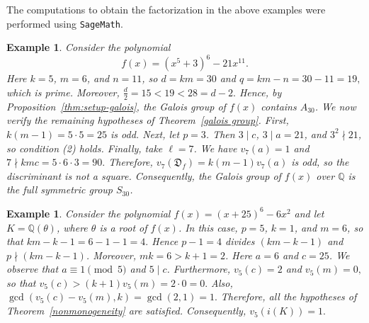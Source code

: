 \documentclass[table]{amsart}
\newtheorem{example}[theorem]{Example}
\newcommand{\D}{\mathfrak{D}}
\numberwithin{equation}{section}
\begin{document}
The computations to obtain the factorization  in the above examples were performed using \texttt{SageMath}.
\begin{example}
Consider the polynomial
\[
f(x)=(x^{5}+3)^{6}-21x^{11}.
\]
Here $k=5$, $m=6$, and $n=11$, so $d=km=30$ and $q=km-n=30-11=19,$ which is prime. Moreover, $\frac{d}{2}=15 < 19 < 28=d-2.$ Hence, by Proposition~\ref{thm:setup-galois}, the Galois group of $f(x)$ contains $A_{30}$. We now verify the remaining hypotheses of Theorem~\ref{galois group}. First, $k(m-1)=5\cdot5=25$ is odd. Next, let $p=3$. Then $3\mid c$, $3\mid a=21$, and $3^{2}\nmid 21$, so condition (2) holds. Finally, take $\ell=7$. We have $v_7(a)=1$  and $7\nmid kmc = 5\cdot6\cdot3 = 90.$ Therefore,
$v_7(\D_f)=k(m-1)v_7(a)$ is odd, so the discriminant is not a square. Consequently, the Galois group of $f(x)$ over $\mathbb{Q}$
is the full symmetric group $S_{30}$.
\end{example}
\begin{example}
Consider the polynomial
$f(x)=(x+25)^6-6x^2$
and let $K=\mathbb{Q}(\theta)$, where $\theta$ is a root of $f(x)$. In this case, $p=5$, $k=1$, and $m=6$, so that
$km-k-1=6-1-1=4.$ Hence $p-1=4$ divides $(km-k-1)$ and $p\nmid (km-k-1)$. Moreover, $mk=6>k+1=2$. Here $a=6$ and $c=25$. We observe that $a\equiv 1 \pmod{5}$ and $5\mid c$.
Furthermore, $v_5(c)=2$ and $v_5(m)=0,$ so that $v_5(c)>(k+1)v_5(m)=2\cdot 0=0.$ Also, $\gcd\! \left (v_5(c)-v_5(m),k\right) = \gcd (2,1) = 1.$ Therefore, all the hypotheses of Theorem~\ref{nonmonogeneity} are satisfied. Consequently, $v_5\!\left(i(K)\right)=1.$
\end{example}





\end{document}
